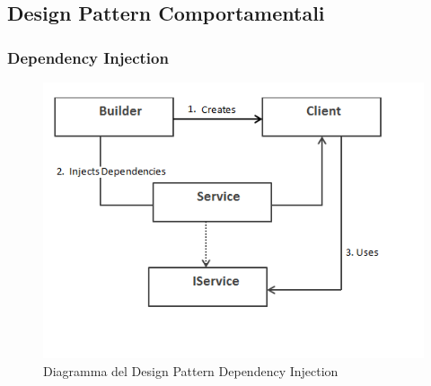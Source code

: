 	\subsection{Design Pattern Comportamentali}
	
		\subsubsection{Dependency Injection}
		\begin{figure}[H]
		\centering
		\includegraphics[width=0.5\linewidth]{GraficiAppendici/dependency.png}
		\caption{Diagramma del Design Pattern Dependency Injection}
	\end{figure}
